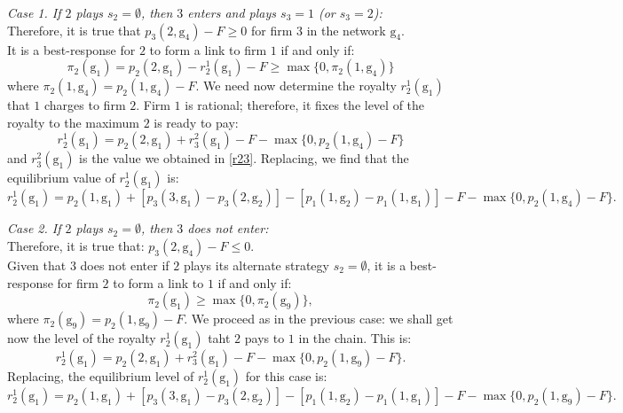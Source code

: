 \documentclass{article}
\begin{document}
\textit{Case 1. If $2$ plays $s_2=\emptyset$, then $3$ enters and plays $s_3=1$ (or $s_3=2$):}\\
Therefore, it is true that $p_3(2,\text{g}_4)-F\geq 0$ for firm $3$ in the network $\text{g}_4$.\\
It is a best-response for $2$ to form a link to firm $1$ if and only if: 
\begin{equation*}
    \pi_2(\text{g}_1)=p_2(2,\text{g}_1)-r^1_2(\text{g}_1)-F \geq \max\{0, \pi_2(1,\text{g}_4)\}
\end{equation*}
where $\pi_2(1,\text{g}_4)=p_2(1,\text{g}_4)-F$. We need now determine the royalty $r^1_2(\text{g}_1)$ that $1$ charges to firm $2$. Firm $1$ is rational; therefore, it fixes the level of the royalty to the maximum $2$ is ready to pay: 
\begin{equation*}
    r^1_2(\text{g}_1)= p_2(2,\text{g}_1)+r^2_3(\text{g}_1)-F - \max\{0, p_2(1,\text{g}_4)-F\}
\end{equation*}
and $r^2_3(\text{g}_1)$ is the value we obtained in \eqref{r23}. Replacing, we find that the equilibrium value of $r^1_2(\text{g}_1)$ is: 
\begin{equation}
    r^1_2(\text{g}_1)= p_2(1,\text{g}_1)+[ p_3(3,\text{g}_1)-p_3(2,\text{g}_2)]-[p_1(1,\text{g}_2)-p_1(1,\text{g}_1)]-F - \max\{0, p_2(1,\text{g}_4)-F\}. \label{r12}
\end{equation}

\textit{Case 2. If $2$ plays $s_2=\emptyset$, then $3$ does not enter:}\\
Therefore, it is true that: $p_3(2,\text{g}_4)-F\leq 0$. \\
Given that $3$ does not enter if $2$ plays its alternate strategy $s_2=\emptyset$, it is a best-response for firm $2$ to form a link to $1$ if and only if: 
\begin{equation*}
    \pi_2(\text{g}_1)\geq \max\{0, \pi_2(\text{g}_9)\},
\end{equation*}
where $\pi_2(\text{g}_9)=p_2(1,\text{g}_9)-F$. We proceed as in the previous case: we shall get now the level of the royalty $r^1_2(\text{g}_1)$ taht $2$ pays to $1$ in the chain. This is: 
\begin{equation*}
    r^1_2(\text{g}_1)=p_2(2,\text{g}_1) +r^2_3(\text{g}_1)-F- \max\{0, p_2(1,\text{g}_9)-F\}. 
\end{equation*}
Replacing, the equilibrium level of $r^1_2(\text{g}_1)$ for this case is: 
\begin{equation}
    r^1_2(\text{g}_1)=p_2(1,\text{g}_1)+[ p_3(3,\text{g}_1)-p_3(2,\text{g}_2)]-[p_1(1,\text{g}_2)-p_1(1,\text{g}_1)]-F - \max\{0, p_2(1,\text{g}_9)-F\}.\label{r12bis}
\end{equation}
\end{document}

